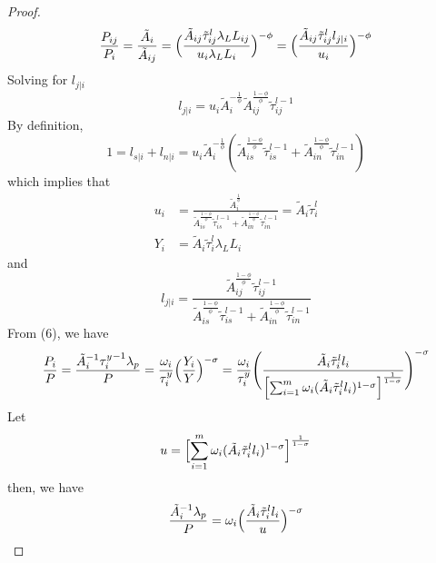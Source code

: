 \documentclass{article}
\begin{document}
\begin{proof}
    \begin{equation*}
        \frac{P_{ij}}{P_i}=\frac{\tilde{A}_i}{\tilde{A}_{ij}}=\Bigl( \frac{\tilde{A}_{ij} \tilde{\tau}_{ij}^l \lambda_L L_{ij}}{u_i \lambda_L L_i} \Bigr)^{-\phi}=\Bigl( \frac{\tilde{A}_{ij} \tilde{\tau}_{ij}^l l_{j|i}}{u_i} \Bigr)^{-\phi}
    \end{equation*}
    Solving for $l_{j|i}$
    \begin{equation*}
        l_{j|i}=u_i \tilde{A}_i^{-\frac{1}{\phi}} \tilde{A}_{ij}^{\frac{1-\phi}{\phi}} \tilde{\tau}_{ij}^{l-1}
    \end{equation*}
    By definition,
    \begin{equation*}
        1=l_{s|i}+l_{n|i}=u_i \tilde{A}_i^{-\frac{1}{\phi}} (\tilde{A}_{is}^{\frac{1-\phi}{\phi}} \tilde{\tau}_{is}^{l-1} + \tilde{A}_{in}^{\frac{1-\phi}{\phi}} \tilde{\tau}_{in}^{l-1})
    \end{equation*}
    which implies that
    \begin{align*}
        u_i&=\frac{\tilde{A}_i^{\frac{1}{\phi}}}{\tilde{A}_{is}^{\frac{1-\phi}{\phi}} \tilde{\tau}_{is}^{l-1} + \tilde{A}_{in}^{\frac{1-\phi}{\phi}} \tilde{\tau}_{in}^{l-1}}=\tilde{A}_i \tilde{\tau}_i^l\\
        Y_i&=\tilde{A}_i \tilde{\tau}_i^l \lambda_L L_i
    \end{align*}
    and
    \begin{equation}
        l_{j|i}=\frac{\tilde{A}_{ij}^{\frac{1-\phi}{\phi}} \tilde{\tau}_{ij}^{l-1}}{\tilde{A}_{is}^{\frac{1-\phi}{\phi}} \tilde{\tau}_{is}^{l-1} + \tilde{A}_{in}^{\frac{1-\phi}{\phi}} \tilde{\tau}_{in}^{l-1}}
    \end{equation}
    From (6), we have 
    \begin{equation*}
        \frac{P_i}{P}=\frac{\tilde{A}_{i}^{-1} {\tau_i^{y}}^{-1} \lambda_p}{P}=\frac{\omega_i}{\tau_i^y} \Bigl( \frac{Y_i}{Y} \Bigr)^{-\sigma}=\frac{\omega_i}{\tau_i^y} \Biggl( \frac{\tilde{A}_i \tilde{\tau}_i^l l_i}{\Bigl[\sum_{i=1}^m \omega_i (\tilde{A}_i \tilde{\tau}_i^l l_i)^{1-\sigma}\Bigr]^{\frac{1}{1-\sigma}}} \Biggr) ^{-\sigma}
    \end{equation*}
    Let 
    \begin{equation*}
        u=\Bigl[\sum_{i=1}^m \omega_i (\tilde{A}_i \tilde{\tau}_i^l l_i)^{1-\sigma}\Bigr]^{\frac{1}{1-\sigma}}
    \end{equation*}
    then, we have
    \begin{equation*}
        \frac{\tilde{A}_{i}^{-1} \lambda_p}{P}=\omega_i \Bigl(\frac{\tilde{A}_i \tilde{\tau}_i^l l_i}{u}\Bigr)^{-\sigma}

\end{equation*}
\end{proof}
\end{document}
